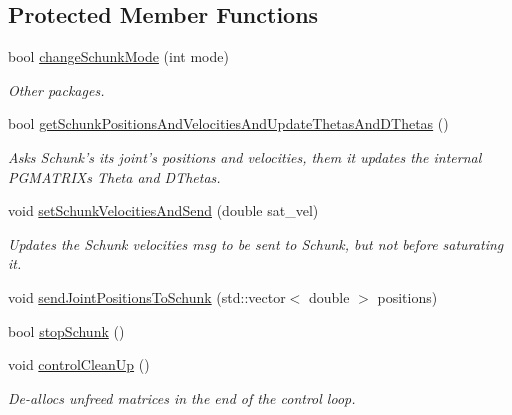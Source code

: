 \subsection*{Protected Member Functions}
\begin{DoxyCompactItemize}
\item 
bool \hyperlink{classCartesian__controller_aaf006f80e89c08cf040956afbb4cf3c0}{change\-Schunk\-Mode} (int mode)
\begin{DoxyCompactList}\small\item\em Other packages. \end{DoxyCompactList}\item 
bool \hyperlink{classCartesian__controller_a0d7a63bac84715f6742db738df246f91}{get\-Schunk\-Positions\-And\-Velocities\-And\-Update\-Thetas\-And\-D\-Thetas} ()
\begin{DoxyCompactList}\small\item\em Asks Schunk's its joint's positions and velocities, them it updates the internal P\-G\-M\-A\-T\-R\-I\-Xs Theta and D\-Thetas. \end{DoxyCompactList}\item 
void \hyperlink{classCartesian__controller_a40d17a9794af8a9a607618bf0ee5efff}{set\-Schunk\-Velocities\-And\-Send} (double sat\-\_\-vel)
\begin{DoxyCompactList}\small\item\em Updates the Schunk velocities msg to be sent to Schunk, but not before saturating it. \end{DoxyCompactList}\item 
void \hyperlink{classCartesian__controller_ae845f67c81c2649bfbaccf95230f2599}{send\-Joint\-Positions\-To\-Schunk} (std\-::vector$<$ double $>$ positions)
\item 
bool \hyperlink{classCartesian__controller_a3ba54e8b35632526c5e8eb2ab5d7de0d}{stop\-Schunk} ()
\item 
void \hyperlink{classCartesian__controller_a8c0f0b41de9f4f8b2e3aa327e7c6b50c}{control\-Clean\-Up} ()
\begin{DoxyCompactList}\small\item\em De-\/allocs unfreed matrices in the end of the control loop. \end{DoxyCompactList}\end{DoxyCompactItemize}
